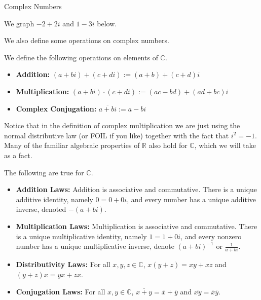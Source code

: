 \begin{section}{Complex Numbers}
\begin{example}
We graph $-2 + 2i$ and  $1 - 3i$ below.
\begin{center}
\end{center}
\end{example}

We also define some operations on complex numbers.

\begin{definition}
We define the following operations on elements of $\mathbb{C}$. 
\begin{itemize}
\item \textbf{Addition:} $(a+bi) + (c+di) := (a+b) + (c+d)i$
\item \textbf{Multiplication:} $(a+bi) \cdot (c+di) := (ac-bd) + (ad+bc)i$
\item \textbf{Complex Conjugation:} $\overline{a+bi} := a-bi$
\end{itemize}
\end{definition}

Notice that in the definition of complex multiplication we are just using the normal distributive law (or FOIL if you like) together with the fact that $i^2 = -1$. Many of the familiar algebraic properties of $\mathbb{R}$ also hold for $\mathbb{C}$, which we will take as a fact.

\begin{fact}\label{fact.ComplexLaws} The following are true for $\mathbb{C}$.
\begin{itemize}
\item \textbf{Addition Laws:} Addition is associative and commutative. There is a unique additive identity, namely $0 = 0 + 0i$, and every number has a unique additive inverse, denoted $-(a+bi)$.
\item \textbf{Multiplication Laws:} Multiplication is associative and commutative. There is a unique multiplicative identity, namely $1 = 1 + 0i$, and every nonzero number has a unique multiplicative inverse, denote $(a+bi)^{-1}$ or $\frac{1}{a+bi}$.
\item \textbf{Distributivity Laws:} For all $x,y,z \in \mathbb{C}$, $x(y+z) = xy+xz$ and $(y+z)x = yx+zx$.
\item \textbf{Conjugation Laws:} For all $x,y \in \mathbb{C}$, $\overline{x+y} = \overline{x} + \overline{y}$ and $\overline{xy} = \overline{x}\overline{y}$.
\end{itemize}
\end{fact}


\end{section}
